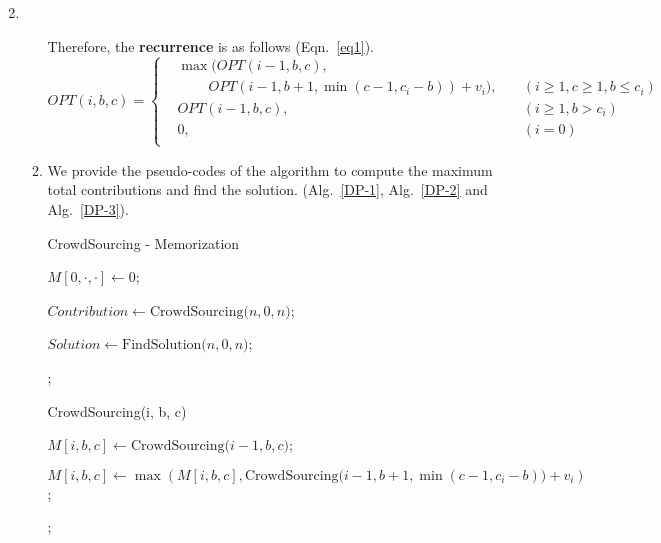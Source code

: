 \documentclass[12pt,a4paper]{article}
\makeatletter
\newtheorem*{solution}{Solution}
\theoremstyle{definition}
\renewenvironment{solution}[1][Solution] {\par\pushQED{\qed}\normalfont\topsep6\p@\@plus6\p@\relax\trivlist\item[\hskip\labelsep\bfseries#1\@addpunct{.}]\ignorespaces}{\popQED\endtrivlist\@endpefalse} \makeatother
\makeatother
\begin{document}
\begin{enumerate}
\begin{solution}
\begin{enumerate}
        Therefore, the \textbf{recurrence} is as follows (Eqn.~\eqref{eq1}).
        \begin{equation}
        OPT(i,b,c) = \left\{
        \begin{aligned}
        & \max(OPT(i - 1, b, c), \\
        & \ \quad \quad OPT(i - 1, b + 1, \min(c - 1, c_i - b)) + v_i), & \quad (i \geq 1, c \geq 1, b \leq c_i) \\
        & OPT(i - 1, b, c), & \quad (i \geq 1, b > c_i) \\
        & 0, & \quad (i = 0) \\
        \end{aligned}
        \right.
        \label{eq1}
        \end{equation}
    \item We provide the pseudo-codes of the algorithm to compute the maximum total contributions and find the solution. (Alg.~\ref{DP-1}, Alg.~\ref{DP-2} and Alg.~\ref{DP-3}).

    \begin{minipage}[t]{0.9\textwidth}
        \begin{algorithm}[H]

            \BlankLine
            \caption{CrowdSourcing - Memorization}
            \label{DP-1}
            $M[0, \cdot, \cdot] \leftarrow 0$;

            $Contribution \leftarrow \mathrm{CrowdSourcing(}n, 0, n\mathrm{)}$;

            $Solution \leftarrow \mathrm{FindSolution(}n, 0, n\mathrm{)}$;

            ;
        \end{algorithm}
    \end{minipage}

    \begin{minipage}[t]{0.9\textwidth}
        \begin{algorithm}[H]
            \caption{CrowdSourcing(i, b, c)}
            \label{DP-2}
             {
                $M[i, b, c] \leftarrow \mathrm{CrowdSourcing(}i-1,b,c\mathrm{)}$;

                 {
                    $M[i, b, c] \leftarrow \max(M[i, b, c], \mathrm{CrowdSourcing(}i-1,b+1,\min(c-1, c_i - b)\mathrm{)} + v_i)$;
                }
            }
            ;
        \end{algorithm}
    \end{minipage}


\end{enumerate}
\end{solution}
\end{enumerate}
\end{document}
